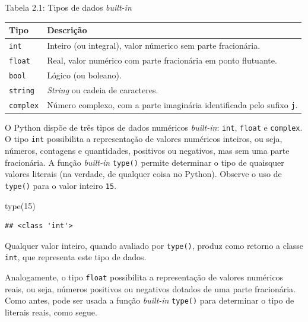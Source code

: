 \documentclass[
]{book}
\newenvironment{Shaded}{\begin{snugshade}}{\end{snugshade}}
\newcommand{\BuiltInTok}[1]{#1}
\newcommand{\DecValTok}[1]{\textcolor[rgb]{0.00,0.00,0.81}{#1}}
\newcommand{\NormalTok}[1]{#1}
\begin{document}
Tabela 2.1: Tipos de dados \emph{built-in}

\begin{longtable}[]{@{}
  >{\raggedright\arraybackslash}p{}
  >{\raggedright\arraybackslash}p{}@{}}
\toprule
Tipo & Descrição \\
\midrule
\endhead
\texttt{int} & Inteiro (ou integral), valor númerico sem parte fracionária. \\
\texttt{float} & Real, valor numérico com parte fracionária em ponto flutuante. \\
\texttt{bool} & Lógico (ou boleano). \\
\texttt{string} & \emph{String} ou cadeia de caracteres. \\
\texttt{complex} & Número complexo, com a parte imaginária identificada pelo sufixo \texttt{j}. \\
\bottomrule
\end{longtable}

O Python dispõe de três tipos de dados numéricos \emph{built-in}: \texttt{int}, \texttt{float} e \texttt{complex}. O tipo \texttt{int} possibilita a representação de valores numéricos inteiros, ou seja, números, contagens e quantidades, positivos ou negativos, mas sem uma parte fracionária. A função \emph{built-in} \texttt{type()} permite determinar o tipo de quaisquer valores literais (na verdade, de qualquer coisa no Python). Observe o uso de \texttt{type()} para o valor inteiro \texttt{15}.

\begin{Shaded}
\begin{Highlighting}[]
\BuiltInTok{type}\NormalTok{(}\DecValTok{15}\NormalTok{)}
\end{Highlighting}
\end{Shaded}

\begin{verbatim}
## <class 'int'>
\end{verbatim}

Qualquer valor inteiro, quando avaliado por \texttt{type()}, produz como retorno a classe \texttt{int}, que representa este tipo de dados.

Analogamente, o tipo \texttt{float} possibilita a representação de valores numéricos reais, ou seja, números positivos ou negativos dotados de uma parte fracionária. Como antes, pode ser usada a função \emph{built-in} \texttt{type()} para determinar o tipo de literais reais, como segue.
\end{document}
